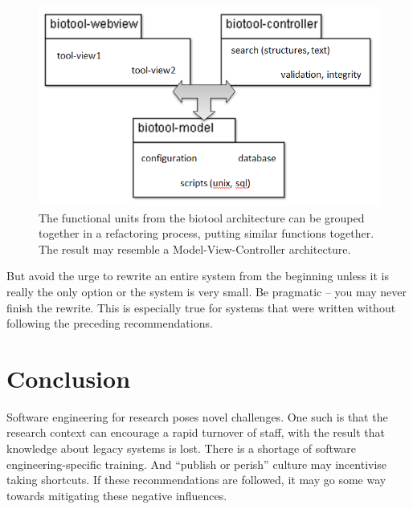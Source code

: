 \documentclass{bmcart}
\begin{document}
\begin{figure}%
\includegraphics[width=\columnwidth]{SimpleClassDiagram.png}%
\caption{The functional units from the biotool architecture can be grouped together in a refactoring process, putting similar functions together. The result may resemble a Model-View-Controller architecture.}%
\label{fig-not-spaghetti}%
\end{figure}

But avoid the urge to rewrite an entire system from the beginning unless it is really the only option or the system is very small. Be pragmatic \cite{pragprog} -- you may never finish the rewrite. This is especially true for systems that were written without following the preceding recommendations. 

\section*{Conclusion}

Software engineering for research poses novel challenges. One such is that the research context can encourage a rapid turnover of staff, with the result that knowledge about legacy systems is lost. There is a shortage of software engineering-specific training. And ``publish or perish'' culture may incentivise taking shortcuts. If these recommendations are followed, it may go some way towards mitigating these negative influences. 


\end{document}
